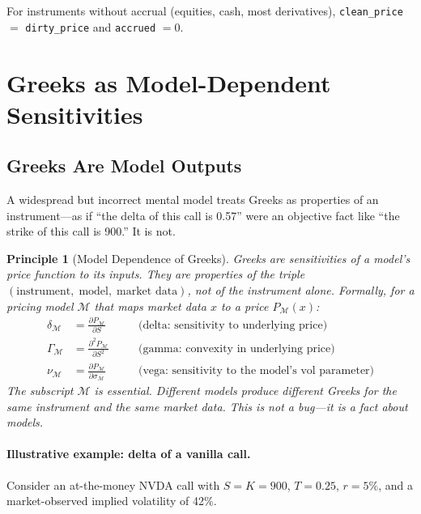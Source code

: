 \documentclass[11pt,a4paper]{article}
\newtheorem{principle}[definition]{Principle}
\begin{document}
For instruments without accrual (equities, cash, most derivatives), \texttt{clean\_price} $=$ \texttt{dirty\_price} and \texttt{accrued} $= 0$.

\clearpage
\section{Greeks as Model-Dependent Sensitivities}
\label{sec:greeks}

\subsection{Greeks Are Model Outputs}

A widespread but incorrect mental model treats Greeks as properties of an instrument---as if ``the delta of this call is 0.57'' were an objective fact like ``the strike of this call is 900.''  It is not.

\begin{principle}[Model Dependence of Greeks]
\label{princ:greeks-model-dep}
Greeks are sensitivities of a \emph{model's price function} to its inputs.  They are properties of the triple $(\text{instrument},\; \text{model},\; \text{market data})$, not of the instrument alone.  Formally, for a pricing model $\mathcal{M}$ that maps market data $x$ to a price $P_\mathcal{M}(x)$:
\begin{align}
\delta_\mathcal{M} &= \frac{\partial P_\mathcal{M}}{\partial S} &\quad&\text{(delta: sensitivity to underlying price)} \\[4pt]
\Gamma_\mathcal{M} &= \frac{\partial^2 P_\mathcal{M}}{\partial S^2} &\quad&\text{(gamma: convexity in underlying price)} \\[4pt]
\nu_\mathcal{M} &= \frac{\partial P_\mathcal{M}}{\partial \sigma_\mathcal{M}} &\quad&\text{(vega: sensitivity to the model's vol parameter)}
\end{align}
The subscript $\mathcal{M}$ is essential.  Different models produce different Greeks for the same instrument and the same market data.  This is not a bug---it is a fact about models.
\end{principle}

\paragraph{Illustrative example: delta of a vanilla call.}  Consider an at-the-money NVDA call with $S = K = 900$, $T = 0.25$, $r = 5\%$, and a market-observed implied volatility of 42\%.
\end{document}
